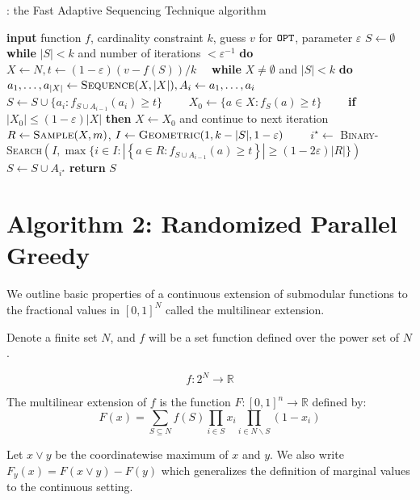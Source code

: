 \documentclass[11pt, a4paper]{article}
\begin{document}
\begin{algorithm}[H]
\caption{\algoptimized: the Fast Adaptive Sequencing Technique algorithm}
\begin{algorithmic}
    \STATE \textbf{input}  function $f$, cardinality constraint $k$, guess $v$ for $\texttt{OPT}$, parameter $\varepsilon$
    \STATE 	 $S \leftarrow \emptyset $
    \STATE  \textbf{while} $|S| < k$ and number of  iterations  $< \varepsilon^{-1}$ \textbf{do}
    \STATE   \ \  $X \leftarrow N,  t \leftarrow (1-\varepsilon) (v - f(S))/k$
	\STATE   \ \ \textbf{while} $X \neq \emptyset$ and $|S| < k$  \textbf{do}
	\STATE  \ \ \ \   $a_1, \ldots, a_{|X|} \leftarrow \textsc{Sequence}(X, |X|), A_i \leftarrow a_1, \ldots, a_i$
	\STATE \ \ \ \   $S \leftarrow S \cup \{a_i : f_{S \cup A_{i-1}}(a_i) \geq t \}$
	\STATE \ \ \ \ $X_0 \leftarrow \{a \in X : f_{S}(a) \geq t\}$
	\STATE \ \ \ \   \textbf{if} $|X_0| \leq (1 - \varepsilon) |X|$ \textbf{then} $X \leftarrow X_0$ and continue to  next iteration
	\STATE \ \ \ \  $R \leftarrow \textsc{Sample}(X, m)$, $I \leftarrow \textsc{Geometric}(1, k - |S|, 1 - \varepsilon)$
    \STATE \ \ \ \  $i^{\star} \leftarrow$ \textsc{Binary-Search}$(I,  \max \{i  \in I : |\left\{a \in R : f_{S \cup A_{i-1}}(a) \geq   t \right\}| \geq (1 - 2 \varepsilon) |R|\})$ 
	\STATE \ \ \ \  $S \leftarrow S \cup A_{i^{\star} }$
    	\STATE \textbf{return} $S$
  \end{algorithmic}
  \label{alg:main}
\end{algorithm}
\section{Algorithm 2: Randomized Parallel Greedy}

We outline basic properties of a continuous extension of submodular functions to the fractional values in $[0,1]^{N}$ called the multilinear extension.

Denote a finite set $N$, and $f$ will be a set function defined over the power set of $N$.

\begin{equation}
    f: 2^{N} \rightarrow \mathbb{R}
\end{equation}
\begin{definition}
The multilinear extension of $f$ is the function $F:[0,1]^{n} \rightarrow \mathbb{R}$ defined by:
\begin{equation}
    F(x)=\sum_{S \subseteq N} f(S) \prod_{i \in S} x_{i} \prod_{i \in N \backslash S}\left(1-x_{i}\right)
\end{equation}
\end{definition}
Let $x \vee y$ be the coordinatewise maximum of $x$ and $y$. We also write $F_y(x) = F (x \vee y) - F (y)$ which generalizes the definition of marginal values to the continuous setting.
\end{document}

